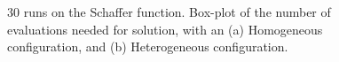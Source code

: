 \documentclass[conference]{IEEEtran}
\begin{document}
\begin{figure}[t]
    \centering


    \caption{30 runs on the Schaffer function. Box-plot of the number of evaluations needed for
      solution, with an (a) Homogeneous configuration, and (b) Heterogeneous configuration.}
    \label{fig:schaffer}
\end{figure}
%
\end{document}
